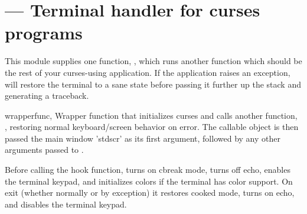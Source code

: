 \section{ ---
         Terminal handler for curses programs}


This module supplies one function, , which runs
another function which should be the rest of your curses-using
application.  If the application raises an exception,
 will restore the terminal to a sane state before
passing it further up the stack and generating a traceback.

\begin{funcdesc}{wrapper}{func, \moreargs}
Wrapper function that initializes curses and calls another function,
, restoring normal keyboard/screen behavior on error.
The callable object  is then passed the main window 'stdscr'
as its first argument, followed by any other arguments passed to
.
\end{funcdesc}

Before calling the hook function,  turns on cbreak
mode, turns off echo, enables the terminal keypad, and initializes
colors if the terminal has color support.  On exit (whether normally
or by exception) it restores cooked mode, turns on echo, and disables
the terminal keypad.

